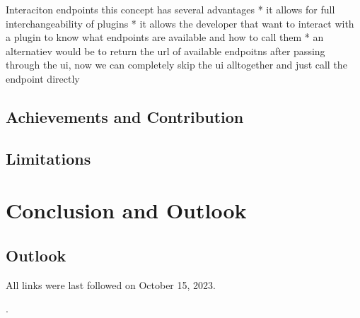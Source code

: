 \documentclass[
  a4paper,  %
  twoside,  %
  bibliography=totoc,
  headsepline,
  cleardoublepage=empty,
  parskip=half,
  draft=false
]{scrbook}
\begin{document}
Interaciton endpoints
this concept has several advantages
* it allows for full interchangeability of plugins
* it allows the developer that want to interact with a plugin to know what endpoints are available and how to call them
* an alternatiev would be to return the url of available endpoitns after passing through the ui, now we can completely skip the ui alltogether and just call the endpoint directly

\section{Achievements and Contribution}
\label{sec:achievementsAndContribution}
\section{Limitations}
\label{sec:limitations}


\chapter{Conclusion and Outlook}
\label{chap:zusfas}

\section{Outlook}

\printbibliography

All links were last followed on October 15, 2023.

\appendix
.

\pagestyle{empty}
\renewcommand*{\chapterpagestyle}{empty}
\Versicherung
\end{document}
